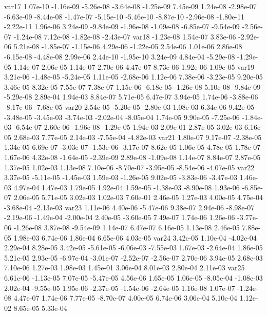 var17  1.07e-10 -1.16e-09 -5.26e-08 -3.64e-08 -1.25e-09  7.45e-09  1.24e-08 -2.98e-07 -6.63e-09 -8.44e-08 -1.47e-07 -5.15e-10 -5.46e-10 -8.87e-10 -2.96e-08 -1.80e-11 -2.22e-11  1.96e-06  3.24e-09 -9.84e-09 -1.96e-08 -1.09e-08 -6.85e-07 -9.54e-09 -2.56e-07 -1.24e-08  7.12e-08 -1.82e-08 -2.43e-07
var18 -1.23e-08  1.54e-07  3.83e-06 -2.92e-06  5.21e-08 -1.85e-07 -1.15e-06  4.29e-06 -1.22e-05  2.54e-06  1.01e-06  2.86e-08 -6.15e-08 -4.48e-08  2.99e-06  2.44e-10 -1.95e-10  3.24e-09  4.84e-04 -5.29e-08 -1.29e-05  1.14e-07  2.06e-05  1.14e-07  2.70e-06  4.47e-07  8.73e-06  1.92e-06  1.09e-05
var19  3.21e-06 -1.48e-05 -5.24e-05  1.11e-05 -2.68e-06  1.12e-06  7.38e-06 -3.23e-05  9.20e-05  3.46e-05  8.32e-05  7.55e-07  7.38e-07  1.15e-06 -6.18e-05 -1.26e-08  5.10e-08 -9.84e-09 -5.29e-08  2.89e-04  1.94e-03  8.84e-07  5.71e-05  6.47e-07  3.94e-05  1.74e-06 -3.88e-06 -8.17e-06 -7.68e-05
var20  2.54e-05 -5.20e-05 -2.80e-03  1.08e-03  6.34e-06  9.42e-05 -3.48e-05 -3.45e-03 -3.74e-03 -2.02e-04 -8.05e-04  1.74e-05  9.90e-05 -7.25e-06 -1.84e-03 -6.54e-07  2.60e-06 -1.96e-08 -1.29e-05  1.94e-03  2.09e-01  2.87e-05  3.02e-03  6.16e-05  2.68e-03  7.77e-05  2.14e-03 -7.55e-04 -4.82e-03
var21  1.80e-07  9.17e-07 -2.38e-05  1.34e-05  6.69e-07 -3.03e-07 -1.53e-06 -3.17e-07  8.62e-05  1.06e-05  4.78e-05  1.78e-07  1.67e-06  4.32e-08 -1.64e-05 -2.39e-09  2.89e-08 -1.09e-08  1.14e-07  8.84e-07  2.87e-05  1.37e-05  1.02e-03  1.13e-08  7.10e-06 -8.70e-07 -3.95e-05 -8.54e-06 -4.07e-05
var22  3.37e-05 -5.11e-05 -1.45e-03  1.59e-03 -1.26e-05  9.02e-05 -3.83e-06 -3.47e-03  1.46e-03  4.97e-04  1.47e-03  1.79e-05  1.92e-04  1.59e-05 -1.38e-03 -8.90e-08  1.93e-06 -6.85e-07  2.06e-05  5.71e-05  3.02e-03  1.02e-03  7.60e-01  2.46e-05  1.27e-03  4.00e-05  4.75e-04 -3.68e-04 -2.13e-03
var23  1.11e-06  4.40e-06 -5.47e-06  9.38e-07  2.94e-06 -8.98e-07 -2.19e-06 -1.49e-04 -2.00e-04  2.40e-05 -3.60e-05  7.49e-07  1.74e-06  1.26e-06 -3.77e-06 -1.26e-08  3.87e-08 -9.54e-09  1.14e-07  6.47e-07  6.16e-05  1.13e-08  2.46e-05  7.88e-05  1.98e-03  6.74e-06  1.86e-04  6.65e-06  4.03e-05
var24  3.42e-05  1.10e-04 -4.02e-04  2.29e-04  8.28e-05  3.42e-05 -5.61e-05 -6.06e-03 -7.55e-03  1.67e-03 -2.64e-04  1.86e-05  5.21e-05  2.93e-05 -6.97e-04 -3.01e-07 -2.52e-07 -2.56e-07  2.70e-06  3.94e-05  2.68e-03  7.10e-06  1.27e-03  1.98e-03  1.45e-01  3.06e-04  8.01e-03  2.80e-04  2.11e-03
var25  6.61e-06 -1.13e-05  7.07e-05 -5.47e-05  4.56e-06  1.65e-05  1.06e-05 -8.05e-04 -1.08e-03  2.02e-04 -9.55e-05  1.95e-06 -2.37e-05 -1.54e-06 -2.64e-05  1.16e-08  1.07e-07 -1.24e-08  4.47e-07  1.74e-06  7.77e-05 -8.70e-07  4.00e-05  6.74e-06  3.06e-04  5.10e-04  1.12e-02  8.65e-05  5.33e-04
